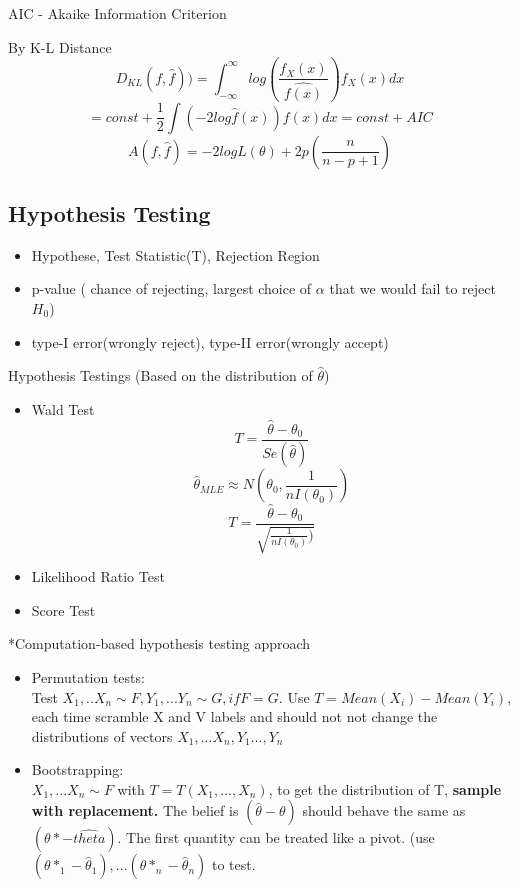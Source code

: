 \documentclass[11pt, openany]{book}              %
\begin{document}
AIC - Akaike Information Criterion

By K-L Distance
$$D_{KL}(f,\hat{f})) = \int_{-\infty}^{\infty} log(\frac{f_X(x)}{\hat{f(x)}})f_X(x)dx $$
$$ = const + \frac{1}{2} \int (-2log\hat{f}(x))f(x)dx = const + AIC $$
$$ A(f,\hat{f}) = -2 logL(\theta) + 2 p (\frac{n}{n-p+1})$$

\subsection{Hypothesis Testing}

\begin{itemize}
    \item Hypothese, Test Statistic(T), Rejection Region
    \item p-value ( chance of rejecting, largest choice of $\alpha$ that we would fail to reject $H_0$)   
    \item type-I error(wrongly reject), type-II error(wrongly accept)
\end{itemize}

Hypothesis Testings (Based on the distribution of $\hat{\theta}$)

\begin{itemize}
    \item Wald Test $$T = \frac{\hat{\theta} - \theta_0}{Se(\hat{\theta})}$$
    $$ \hat{\theta}_{MLE} \approx N(\theta_0, \frac{1}{n I(\theta_0)})$$
   $$T = \frac{\hat{\theta} - \theta_0}{\sqrt{\frac{1}{nI(\theta_0)})}}$$
    \item Likelihood Ratio Test
    \item Score Test
\end{itemize}

*Computation-based hypothesis testing approach

\begin{itemize}
    \item Permutation tests: \\ Test $X_1,..X_n \sim F, Y_1,...Y_n \sim G, if F=G$. Use $T = Mean(X_i )- Mean(Y_i)$, each time scramble X and V labels and should not not change the distributions of vectors $X_1,...X_n, Y_1...,Y_n$
    \item Bootstrapping: \\ $X_1,...X_n \sim F$ with $T = T(X_1,...,X_n)$, to get the distribution of T, \textbf{sample with replacement.} The belief is $(\hat{\theta} - \theta)$ should behave the same as $(\theta* - \hat{theta})$. The first quantity can be treated like a pivot.  (use $(\theta*_1 - \hat{\theta}_1),...(\theta*_n - \hat{\theta}_n)$ to test. 
\end{itemize}
\end{document}
